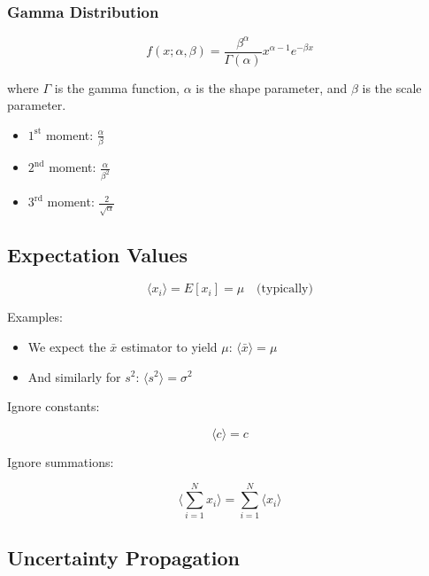 \subsubsection{Gamma Distribution}

\begin{equation*}
    f(x; \alpha, \beta) = \frac{\beta^\alpha}{\Gamma(\alpha)} x^{\alpha-1} e^{-\beta x}
\end{equation*}

where $\Gamma$ is the gamma function, $\alpha$ is the shape parameter, and $\beta$ is the scale parameter.

\begin{itemize}
    \item $1^\text{st}$ moment: $\frac{\alpha}{\beta}$
    \item $2^\text{nd}$ moment: $\frac{\alpha}{\beta^2}$
    \item $3^\text{rd}$ moment: $\frac{2}{\sqrt{\alpha}}$
\end{itemize}

\subsection{Expectation Values}

\begin{equation*}
    \langle x_i \rangle = E[x_i] = \mu \quad \text{(typically)}
\end{equation*}

Examples:

\begin{itemize}
    \item We expect the $\bar{x}$ estimator to yield $\mu$: $\langle \bar{x} \rangle = \mu $
    \item And similarly for $s^2$: $\langle s^2 \rangle = \sigma^2 $
\end{itemize}

Ignore constants:

\begin{equation*}
    \langle c \rangle = c
\end{equation*}

Ignore summations:

\begin{equation*}
    \langle \sum_{i=1}^N x_i \rangle = \sum_{i=1}^N \langle x_i \rangle
\end{equation*}

\subsection{Uncertainty Propagation}

